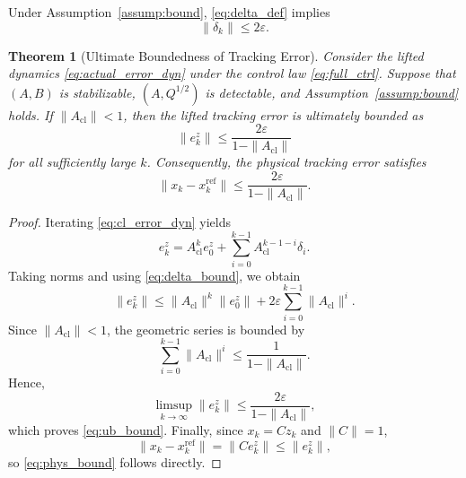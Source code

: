 \documentclass[journal]{IEEEtran}
\newtheorem{theorem}{Theorem}
\begin{document}
Under Assumption~\ref{assump:bound}, \eqref{eq:delta_def} implies
\begin{equation}
    \|\delta_k\| \leq 2\varepsilon.
    \label{eq:delta_bound}
\end{equation}

\begin{theorem}[Ultimate Boundedness of Tracking Error]
\label{thm:ub}
Consider the lifted dynamics \eqref{eq:actual_error_dyn} under the control law \eqref{eq:full_ctrl}. Suppose that $(A,B)$ is stabilizable, $(A,Q^{1/2})$ is detectable, and Assumption~\ref{assump:bound} holds. If $\|A_{\mathrm{cl}}\| < 1$, then the lifted tracking error is ultimately bounded as
\begin{equation}
    \|e_k^z\|
    \leq
    \frac{2\varepsilon}{1 - \|A_{\mathrm{cl}}\|}
    \label{eq:ub_bound}
\end{equation}
for all sufficiently large $k$. Consequently, the physical tracking error satisfies
\begin{equation}
    \|x_k - x_k^{\mathrm{ref}}\|
    \leq
    \frac{2\varepsilon}{1 - \|A_{\mathrm{cl}}\|}.
    \label{eq:phys_bound}
\end{equation}
\end{theorem}

\begin{proof}
Iterating \eqref{eq:cl_error_dyn} yields
\begin{equation}
    e_k^z
    =
    A_{\mathrm{cl}}^k e_0^z
    +
    \sum_{i=0}^{k-1} A_{\mathrm{cl}}^{k-1-i}\delta_i.
    \label{eq:error_iteration}
\end{equation}
Taking norms and using \eqref{eq:delta_bound}, we obtain
\begin{equation}
    \|e_k^z\|
    \leq
    \|A_{\mathrm{cl}}\|^k \|e_0^z\|
    +
    2\varepsilon \sum_{i=0}^{k-1}\|A_{\mathrm{cl}}\|^i.
    \label{eq:error_norm_bound}
\end{equation}
Since $\|A_{\mathrm{cl}}\| < 1$, the geometric series is bounded by
\begin{equation}
    \sum_{i=0}^{k-1}\|A_{\mathrm{cl}}\|^i
    \leq
    \frac{1}{1-\|A_{\mathrm{cl}}\|}.
\end{equation}
Hence,
\begin{equation}
    \limsup_{k\to\infty}\|e_k^z\|
    \leq
    \frac{2\varepsilon}{1-\|A_{\mathrm{cl}}\|},
\end{equation}
which proves \eqref{eq:ub_bound}. Finally, since $x_k = C z_k$ and $\|C\|=1$,
\begin{equation}
    \|x_k - x_k^{\mathrm{ref}}\|
    =
    \|C e_k^z\|
    \leq
    \|e_k^z\|,
\end{equation}
so \eqref{eq:phys_bound} follows directly.
\end{proof}
\end{document}
